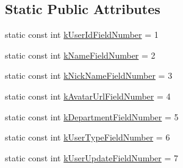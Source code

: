\subsection*{Static Public Attributes}
\begin{DoxyCompactItemize}
\item 
static const int \hyperlink{class_i_m_1_1_base_define_1_1_server_user_info_a44aeb1b06d20451c5af86ae3914123e5}{k\+User\+Id\+Field\+Number} = 1
\item 
static const int \hyperlink{class_i_m_1_1_base_define_1_1_server_user_info_a176b3d1fc14fd5dd1a01b1ef2da7413a}{k\+Name\+Field\+Number} = 2
\item 
static const int \hyperlink{class_i_m_1_1_base_define_1_1_server_user_info_a4e67763f652abf2de1439b7220874ac4}{k\+Nick\+Name\+Field\+Number} = 3
\item 
static const int \hyperlink{class_i_m_1_1_base_define_1_1_server_user_info_aa9ae2c00f10eaba040b92ea5cbf6964f}{k\+Avatar\+Url\+Field\+Number} = 4
\item 
static const int \hyperlink{class_i_m_1_1_base_define_1_1_server_user_info_afbeb99d719fa123f61b34ff7bb90e4a9}{k\+Department\+Field\+Number} = 5
\item 
static const int \hyperlink{class_i_m_1_1_base_define_1_1_server_user_info_ac67552de4e1db474cdb9f5e71e0e82ef}{k\+User\+Type\+Field\+Number} = 6
\item 
static const int \hyperlink{class_i_m_1_1_base_define_1_1_server_user_info_aad4755a9c11ae27c900c0abdaca989a1}{k\+User\+Update\+Field\+Number} = 7
\end{DoxyCompactItemize}
